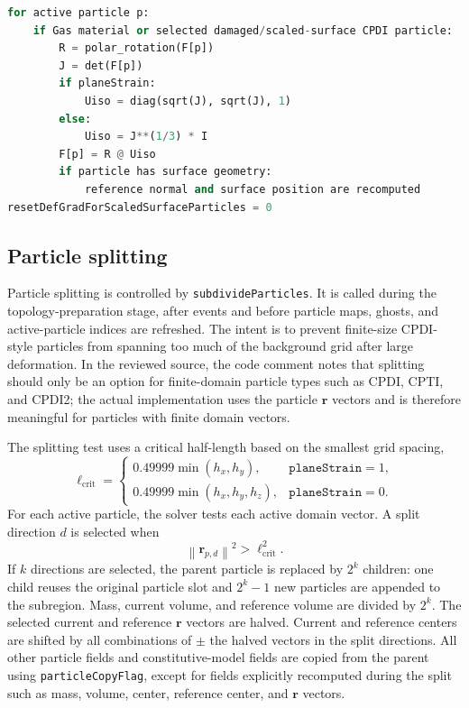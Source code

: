 \begin{lstlisting}[language=Python,caption={Deformation-gradient reset.}]
for active particle p:
    if Gas material or selected damaged/scaled-surface CPDI particle:
        R = polar_rotation(F[p])
        J = det(F[p])
        if planeStrain:
            Uiso = diag(sqrt(J), sqrt(J), 1)
        else:
            Uiso = J**(1/3) * I
        F[p] = R @ Uiso
        if particle has surface geometry:
            reference normal and surface position are recomputed
resetDefGradForScaledSurfaceParticles = 0
\end{lstlisting}

\subsection{Particle splitting}
\label{subsec:robust-particle-splitting}

Particle splitting is controlled by \texttt{subdivideParticles}.  It is called during the topology-preparation stage, after events and before particle maps, ghosts, and active-particle indices are refreshed.  The intent is to prevent finite-size CPDI-style particles from spanning too much of the background grid after large deformation.  In the reviewed source, the code comment notes that splitting should only be an option for finite-domain particle types such as CPDI, CPTI, and CPDI2; the actual implementation uses the particle $\mathbf{r}$ vectors and is therefore meaningful for particles with finite domain vectors.

The splitting test uses a critical half-length based on the smallest grid spacing,
\begin{equation}
  \ell_{\mathrm{crit}} =
  \begin{cases}
    0.49999\min(h_x,h_y), & \texttt{planeStrain}=1,\\[2pt]
    0.49999\min(h_x,h_y,h_z), & \texttt{planeStrain}=0.
  \end{cases}
\end{equation}
For each active particle, the solver tests each active domain vector.  A split direction $d$ is selected when
\begin{equation}
  \left\|\mathbf{r}_{p,d}\right\|^2 > \ell_{\mathrm{crit}}^2.
\end{equation}
If $k$ directions are selected, the parent particle is replaced by $2^k$ children: one child reuses the original particle slot and $2^k-1$ new particles are appended to the subregion.  Mass, current volume, and reference volume are divided by $2^k$.  The selected current and reference $\mathbf{r}$ vectors are halved.  Current and reference centers are shifted by all combinations of $\pm$ the halved vectors in the split directions.  All other particle fields and constitutive-model fields are copied from the parent using \texttt{particleCopyFlag}, except for fields explicitly recomputed during the split such as mass, volume, center, reference center, and $\mathbf{r}$ vectors.

